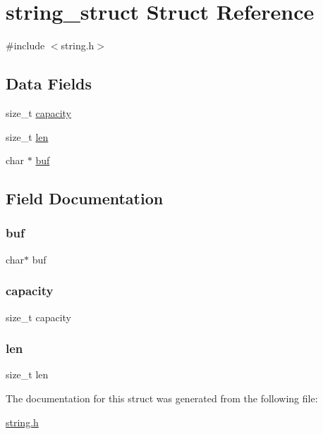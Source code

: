 \hypertarget{structstring__struct}{}\section{string\+\_\+struct Struct Reference}
\label{structstring__struct}


{\ttfamily \#include $<$string.\+h$>$}

\subsection*{Data Fields}
\begin{DoxyCompactItemize}
\item 
size\+\_\+t \hyperlink{structstring__struct_ad721fc6ca6a3d6ba3bc506576622aab0}{capacity}
\item 
size\+\_\+t \hyperlink{structstring__struct_a7360b55975153b822efc5217b7734e6a}{len}
\item 
char $\ast$ \hyperlink{structstring__struct_a1fe855c208bc17a51a4d34fefdb2d5b1}{buf}
\end{DoxyCompactItemize}


\subsection{Field Documentation}
\mbox{\label{structstring__struct_a1fe855c208bc17a51a4d34fefdb2d5b1}} 
\subsubsection{\texorpdfstring{buf}{buf}}
{\footnotesize\ttfamily char$\ast$ buf}

\mbox{\label{structstring__struct_ad721fc6ca6a3d6ba3bc506576622aab0}} 
\subsubsection{\texorpdfstring{capacity}{capacity}}
{\footnotesize\ttfamily size\+\_\+t capacity}

\mbox{\label{structstring__struct_a7360b55975153b822efc5217b7734e6a}} 
\subsubsection{\texorpdfstring{len}{len}}
{\footnotesize\ttfamily size\+\_\+t len}



The documentation for this struct was generated from the following file\+:\begin{DoxyCompactItemize}
\item 
\hyperlink{string_8h}{string.\+h}\end{DoxyCompactItemize}
